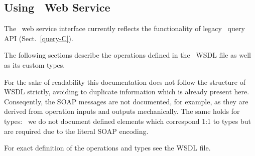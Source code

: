 \subsection{Using \LB\ Web Service}

The \LB\ web service interface currently reflects the functionality of legacy
\LB\ query API (Sect.~\ref{query-C}).

The following sections describe the operations defined in the \LB\ WSDL
file as well as its custom types.

For the sake of readability this documentation does not follow the structure
of WSDL strictly, avoiding to duplicate information which is already present
here.
Conseqently, the SOAP messages are not documented, for example, as they
are derived from operation inputs and outputs mechanically.
The same holds for types: \eg\ we do not document defined elements
which correspond 1:1 to types but are required due to the literal SOAP
encoding.

For exact definition of the operations and types see the WSDL file.

